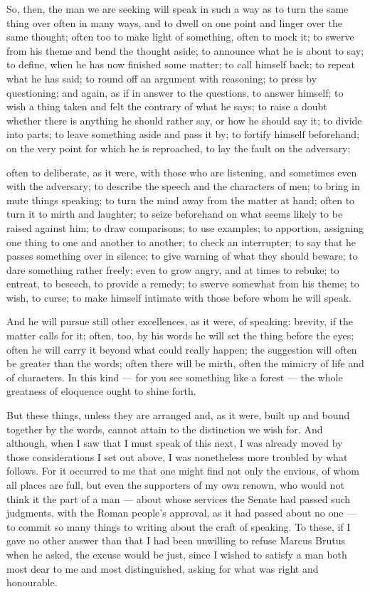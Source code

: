  So, then, the man we are seeking will speak in such a way as to turn the same thing over often in many ways, and to dwell on one point and linger over the same thought; often too to make light of something, often to mock it; to swerve from his theme and bend the thought aside; to announce what he is about to say; to define, when he has now finished some matter; to call himself back; to repeat what he has said; to round off an argument with reasoning; to press by questioning; and again, as if in answer to the questions, to answer himself; to wish a thing taken and felt the contrary of what he says; to raise a doubt whether there is anything he should rather say, or how he should say it; to divide into parts; to leave something aside and pass it by; to fortify himself beforehand; on the very point for which he is reproached, to lay the fault on the adversary;

 often to deliberate, as it were, with those who are listening, and sometimes even with the adversary; to describe the speech and the characters of men; to bring in mute things speaking; to turn the mind away from the matter at hand; often to turn it to mirth and laughter; to seize beforehand on what seems likely to be raised against him; to draw comparisons; to use examples; to apportion, assigning one thing to one and another to another; to check an interrupter; to say that he passes something over in silence; to give warning of what they should beware; to dare something rather freely; even to grow angry, and at times to rebuke; to entreat, to beseech, to provide a remedy; to swerve somewhat from his theme; to wish, to curse; to make himself intimate with those before whom he will speak.

 And he will pursue still other excellences, as it were, of speaking: brevity, if the matter calls for it; often, too, by his words he will set the thing before the eyes; often he will carry it beyond what could really happen; the suggestion will often be greater than the words; often there will be mirth, often the mimicry of life and of characters. In this kind — for you see something like a forest — the whole greatness of eloquence ought to shine forth.

 But these things, unless they are arranged and, as it were, built up and bound together by the words, cannot attain to the distinction we wish for. And although, when I saw that I must speak of this next, I was already moved by those considerations I set out above, I was nonetheless more troubled by what follows. For it occurred to me that one might find not only the envious, of whom all places are full, but even the supporters of my own renown, who would not think it the part of a man — about whose services the Senate had passed such judgments, with the Roman people's approval, as it had passed about no one — to commit so many things to writing about the craft of speaking. To these, if I gave no other answer than that I had been unwilling to refuse Marcus Brutus when he asked, the excuse would be just, since I wished to satisfy a man both most dear to me and most distinguished, asking for what was right and honourable.

